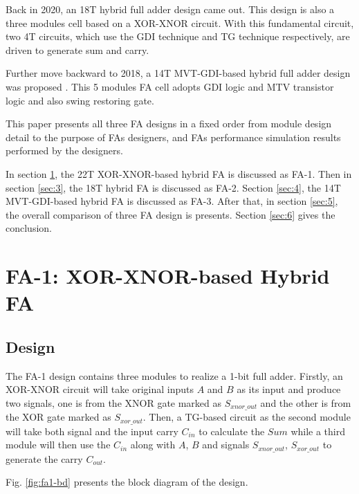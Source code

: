 \documentclass[conference]{IEEEtran}
\begin{document}
Back in 2020, an 18T hybrid full adder design \cite{9339799} came out.
This design is also a three modules cell based on a XOR-XNOR circuit.
With this fundamental circuit, two 4T circuits, which use the GDI technique and TG technique respectively, are driven to generate sum and carry.

Further move backward to 2018, a 14T MVT-GDI-based hybrid full adder design was proposed \cite{18743001}.
This 5 modules FA cell adopts GDI logic and MTV transistor logic and also swing restoring gate.

This paper presents all three FA designs in a fixed order
from module design detail to the purpose of FAs designers, and FAs performance simulation results performed by the designers.

In section \ref{sec:2}, the 22T XOR-XNOR-based hybrid FA is discussed as FA-1.
Then in section \ref{sec:3}, the 18T hybrid FA is discussed as FA-2.
Section \ref{sec:4}, the 14T MVT-GDI-based hybrid FA is discussed as FA-3.
After that, in section \ref{sec:5}, the overall comparison of three FA design is presents.
Section \ref{sec:6} gives the conclusion.


\section{FA-1: XOR-XNOR-based Hybrid FA}
\label{sec:2}

\subsection{Design}

The FA-1 \cite{20212210429416} design contains three modules to realize a 1-bit full adder.
Firstly, an XOR-XNOR circuit will take original inputs \(A\) and \(B\) as its input and produce two signals,
one is from the XNOR gate marked as \(S_{xnor\_out}\) and the other is from the XOR gate marked as \( S_{xor\_out}\).
Then, a TG-based circuit as the second module will take both signal and the input carry \(C_{in}\) to calculate the \(Sum\)
while a third module will then use the \(C_{in}\) along with \(A\), \(B\) and signals \(S_{xnor\_out}\), \( S_{xor\_out}\) to generate the carry \(C_{out}\).

Fig. \ref{fig:fa1-bd} presents the block diagram of the design.
\end{document}
